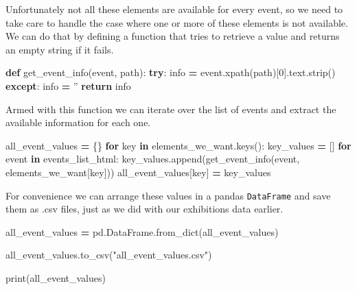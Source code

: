 \documentclass[]{book}
\newenvironment{Shaded}{\begin{snugshade}}{\end{snugshade}}
\newcommand{\BuiltInTok}[1]{#1}
\newcommand{\ControlFlowTok}[1]{\textcolor[rgb]{0.13,0.29,0.53}{\textbf{#1}}}
\newcommand{\DecValTok}[1]{\textcolor[rgb]{0.00,0.00,0.81}{#1}}
\newcommand{\KeywordTok}[1]{\textcolor[rgb]{0.13,0.29,0.53}{\textbf{#1}}}
\newcommand{\NormalTok}[1]{#1}
\newcommand{\OperatorTok}[1]{\textcolor[rgb]{0.81,0.36,0.00}{\textbf{#1}}}
\newcommand{\StringTok}[1]{\textcolor[rgb]{0.31,0.60,0.02}{#1}}
\begin{document}
Unfortunately not all these elements are available for every event, so
we need to take care to handle the case where one or more of these
elements is not available. We can do that by defining a function that
tries to retrieve a value and returns an empty string if it fails.

\begin{Shaded}
\begin{Highlighting}[]
\KeywordTok{def}\NormalTok{ get_event_info(event, path):}
    \ControlFlowTok{try}\NormalTok{:}
\NormalTok{        info }\OperatorTok{=}\NormalTok{ event.xpath(path)[}\DecValTok{0}\NormalTok{].text.strip()}
    \ControlFlowTok{except}\NormalTok{:}
\NormalTok{        info }\OperatorTok{=} \StringTok{''}
    \ControlFlowTok{return}\NormalTok{ info}
\end{Highlighting}
\end{Shaded}

Armed with this function we can iterate over the list of events and
extract the available information for each one.

\begin{Shaded}
\begin{Highlighting}[]
\NormalTok{all_event_values }\OperatorTok{=}\NormalTok{ \{\}}
\ControlFlowTok{for}\NormalTok{ key }\KeywordTok{in}\NormalTok{ elements_we_want.keys():}
\NormalTok{    key_values }\OperatorTok{=}\NormalTok{ []}
    \ControlFlowTok{for}\NormalTok{ event }\KeywordTok{in}\NormalTok{ events_list_html: }
\NormalTok{        key_values.append(get_event_info(event, elements_we_want[key]))}
\NormalTok{    all_event_values[key] }\OperatorTok{=}\NormalTok{ key_values}
\end{Highlighting}
\end{Shaded}

For convenience we can arrange these values in a pandas \texttt{DataFrame}
and save them as .csv files, just as we did with our exhibitions data earlier.

\begin{Shaded}
\begin{Highlighting}[]
\NormalTok{all_event_values }\OperatorTok{=}\NormalTok{ pd.DataFrame.from_dict(all_event_values)}

\NormalTok{all_event_values.to_csv(}\StringTok{"all_event_values.csv"}\NormalTok{)}

\BuiltInTok{print}\NormalTok{(all_event_values)}
\end{Highlighting}
\end{Shaded}
\end{document}
